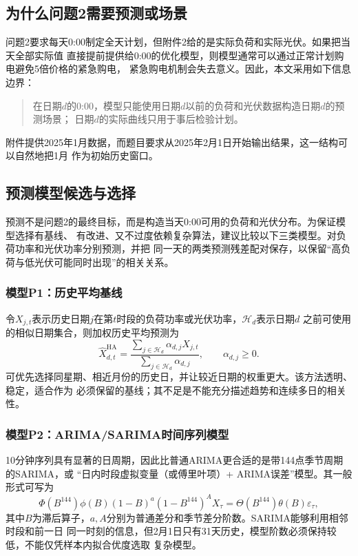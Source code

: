\documentclass[UTF8,11pt]{ctexart}
\begin{document}
\subsection{为什么问题2需要预测或场景}

问题2要求每天0:00制定全天计划，但附件2给的是实际负荷和实际光伏。如果把当天全部实际值
直接提前提供给0:00的优化模型，则模型通常可以通过正常计划购电避免5倍价格的紧急购电，
紧急购电机制会失去意义。因此，本文采用如下信息边界：
\begin{quote}
在日期$d$的0:00，模型只能使用日期$d$以前的负荷和光伏数据构造日期$d$的预测场景；
日期$d$的实际曲线只用于事后检验计划。
\end{quote}
附件提供2025年1月数据，而题目要求从2025年2月1日开始输出结果，这一结构可以自然地把1月
作为初始历史窗口。

\subsection{预测模型候选与选择}

预测不是问题2的最终目标，而是构造当天0:00可用的负荷和光伏分布。为保证模型选择有基线、
有改进、又不过度依赖复杂算法，建议比较以下三类模型。对负荷功率和光伏功率分别预测，并把
同一天的两类预测残差配对保存，以保留“高负荷与低光伏可能同时出现”的相关关系。

\subsubsection{模型P1：历史平均基线}

令$X_{j,t}$表示历史日期$j$在第$t$时段的负荷功率或光伏功率，$\mathcal{H}_d$表示日期$d$
之前可使用的相似日期集合，则加权历史平均预测为
\begin{equation}
    \widehat X^{\mathrm{HA}}_{d,t}
    =\frac{\sum_{j\in\mathcal{H}_d}\alpha_{d,j}X_{j,t}}
    {\sum_{j\in\mathcal{H}_d}\alpha_{d,j}},
    \qquad \alpha_{d,j}\geq0.
    \label{eq:historical-average}
\end{equation}
可优先选择同星期、相近月份的历史日，并让较近日期的权重更大。该方法透明、稳定，适合作为
必须保留的基线；其不足是不能充分描述趋势和连续多日的相关性。

\subsubsection{模型P2：ARIMA/SARIMA时间序列模型}

10分钟序列具有显著的日周期，因此比普通ARIMA更合适的是带144点季节周期的SARIMA，或
“日内时段虚拟变量（或傅里叶项）+ ARIMA误差”模型。其一般形式可写为
\begin{equation}
 \Phi(B^{144})\phi(B)(1-B)^a(1-B^{144})^A X_\tau
 =\Theta(B^{144})\theta(B)\varepsilon_\tau,
 \label{eq:sarima}
\end{equation}
其中$B$为滞后算子，$a,A$分别为普通差分和季节差分阶数。SARIMA能够利用相邻时段和前一日
同一时刻的信息，但2月1日只有31天历史，模型阶数必须保持较低，不能仅凭样本内拟合优度选取
复杂模型。
\end{document}
